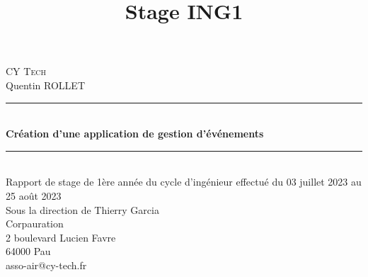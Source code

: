 

\RequirePackage{babel} %
\RequirePackage[utf8]{inputenc} %
\RequirePackage[section]{placeins}%
\RequirePackage[T1]{fontenc} %
\RequirePackage{float} %
\RequirePackage{graphicx} %
\RequirePackage[justification=centering]{caption} %
\RequirePackage{subcaption}
\RequirePackage{wallpaper}
\RequirePackage{nomencl}
\RequirePackage{fancyhdr}
\setlength{\headheight}{2cm}
\RequirePackage{url}
\RequirePackage[hidelinks]{hyperref}%
\RequirePackage[left=2.5cm,right=2.5cm,top=4cm,bottom=4cm]{geometry} %
\RequirePackage{tikz}
\RequirePackage{pdfpages}


\chead{} %
\cfoot{\thepage}

\title{Stage ING1}




\begin{titlepage}
	\newcommand{\HRule}{\rule{\linewidth}{0.5mm}}
	\center
	\textsc{\LARGE
	CY Tech
	} \\[1cm]
	Quentin ROLLET\\[1cm]
	\HRule \\[0.4cm]
	{ \huge \bfseries Création d'une application de gestion d'événements \\[0.15cm] }
	\HRule \\[1.5cm]
	Rapport de stage de 1ère année du cycle d'ingénieur effectué du 03 juillet 2023 au 25 août 2023
	\\[1cm]
	
	Sous la direction de Thierry Garcia
	\\[5cm]
	
	Corpauration\\
	2 boulevard Lucien Favre\\
	64000 Pau\\
	asso-air@cy-tech.fr\\
\end{titlepage}

